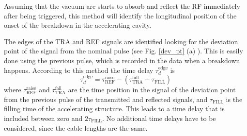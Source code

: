 Assuming that the vacuum arc starts to absorb and reflect the RF immediately after being triggered, this method will identify the longitudinal position of the onset of the breakdown in the accelerating cavity.

The edges of the TRA and REF signals are identified looking for the deviation point of the signal from the nominal pulse (see Fig. \ref{dev_pt} (a) ). This is easily done using the previous pulse, which is recorded in the data when a breakdown happens.  According to this method the time delay $\tau_d^{\text{edge}}$ is
\begin{equation}
\tau_d^{\text{edge}} = \tau_\text{REF} ^\text{raise} - (\tau_\text{TRA} ^\text{fall} - \tau_{\text{FILL}})
\end{equation}
where $\tau^\text{raise} _{\text{REF}} $ and $\tau^\text{fall} _{\text{TRA}}$ are the time position in the signal of the deviation point from the previous pulse of the transmitted and reflected signals, and $\tau_{\text{FILL}}$ is the filling time of the accelerating structure. This leads to a time delay that is included between zero and $2 \tau_{\text{FILL}}$. No additional time delays have to be considered, since the cable lengths are the same. 


